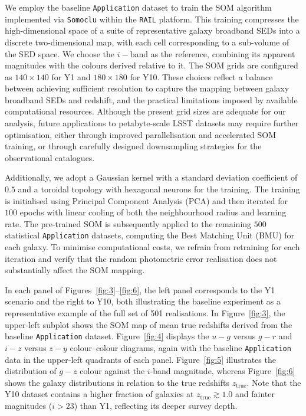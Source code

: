 We employ the baseline \texttt{Application} dataset to train the SOM algorithm implemented via \texttt{Somoclu} \citep{2013arXiv1305.1422W} within the \texttt{RAIL} platform. This training compresses the high-dimensional space of a suite of representative galaxy broadband SEDs into a discrete two-dimensional map, with each cell corresponding to a sub-volume of the SED space. We choose the \(i-\)band as the reference, combining its apparent magnitudes with the colours derived relative to it. The SOM grids are configured as \(140 \times 140\) for Y1 and \(180 \times 180\) for Y10. These choices reflect a balance between achieving sufficient resolution to capture the mapping between galaxy broadband SEDs and redshift, and the practical limitations imposed by available computational resources. Although the present grid sizes are adequate for our analysis, future applications to petabyte-scale LSST datasets may require further optimisation, either through improved parallelisation and accelerated SOM training, or through carefully designed downsampling strategies for the observational catalogues.

Additionally, we adopt a Gaussian kernel with a standard deviation coefficient of \(0.5\) and a toroidal topology with hexagonal neurons for the training. The training is initialised using Principal Component Analysis (PCA) and then iterated for \(100\) epochs with linear cooling of both the neighbourhood radius and learning rate. The pre-trained SOM is subsequently applied to the remaining \(500\) statistical \texttt{Application} datasets, computing the Best Matching Unit (BMU) for each galaxy. To minimise computational costs, we refrain from retraining for each iteration and verify that the random photometric error realisation does not substantially affect the SOM mapping.

In each panel of Figures~\ref{fig:3}–\ref{fig:6}, the left panel corresponds to the Y1 scenario and the right to Y10, both illustrating the baseline experiment as a representative example of the full set of 501 realisations. In Figure~\ref{fig:3}, the upper‐left subplot shows the SOM map of mean true redshifts derived from the baseline \texttt{Application} dataset. Figure~\ref{fig:4} displays the \(u - g\) versus \(g - r\) and \(i - z\) versus \(z - y\) colour–colour diagrams, again with the baseline \texttt{Application} data in the upper‐left quadrants of each panel. Figure~\ref{fig:5} illustrates the distribution of \(g - z\) colour against the \(i\)-band magnitude, whereas Figure~\ref{fig:6} shows the galaxy distributions in relation to the true redshifts \(z_{\mathrm{true}}\). Note that the Y10 dataset contains a higher fraction of galaxies at \(z_\mathrm{true} \gtrsim 1.0\) and fainter magnitudes (\(i > 23 \)) than Y1, reflecting its deeper survey depth.

